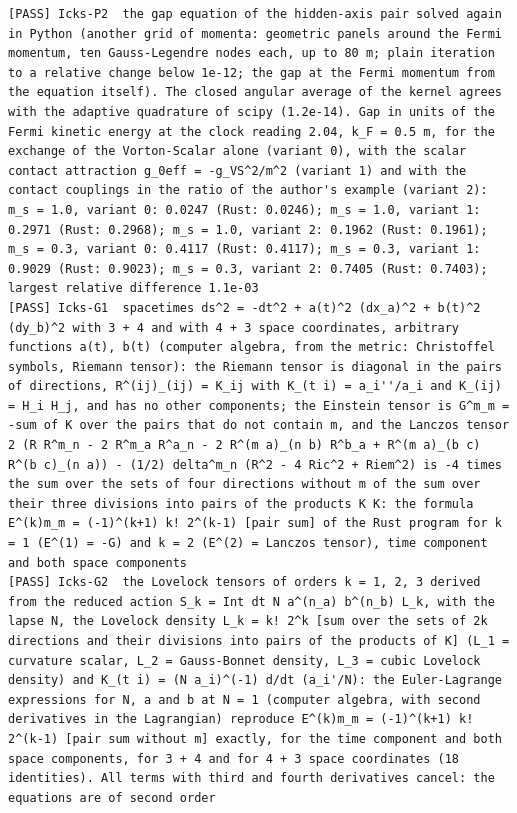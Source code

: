\documentclass[
  10pt,
]{article}
\begin{document}
\begin{verbatim}
[PASS] Icks-P2  the gap equation of the hidden-axis pair solved again in Python (another grid of momenta: geometric panels around the Fermi momentum, ten Gauss-Legendre nodes each, up to 80 m; plain iteration to a relative change below 1e-12; the gap at the Fermi momentum from the equation itself). The closed angular average of the kernel agrees with the adaptive quadrature of scipy (1.2e-14). Gap in units of the Fermi kinetic energy at the clock reading 2.04, k_F = 0.5 m, for the exchange of the Vorton-Scalar alone (variant 0), with the scalar contact attraction g_0eff = -g_VS^2/m^2 (variant 1) and with the contact couplings in the ratio of the author's example (variant 2): m_s = 1.0, variant 0: 0.0247 (Rust: 0.0246); m_s = 1.0, variant 1: 0.2971 (Rust: 0.2968); m_s = 1.0, variant 2: 0.1962 (Rust: 0.1961); m_s = 0.3, variant 0: 0.4117 (Rust: 0.4117); m_s = 0.3, variant 1: 0.9029 (Rust: 0.9023); m_s = 0.3, variant 2: 0.7405 (Rust: 0.7403); largest relative difference 1.1e-03
[PASS] Icks-G1  spacetimes ds^2 = -dt^2 + a(t)^2 (dx_a)^2 + b(t)^2 (dy_b)^2 with 3 + 4 and with 4 + 3 space coordinates, arbitrary functions a(t), b(t) (computer algebra, from the metric: Christoffel symbols, Riemann tensor): the Riemann tensor is diagonal in the pairs of directions, R^(ij)_(ij) = K_ij with K_(t i) = a_i''/a_i and K_(ij) = H_i H_j, and has no other components; the Einstein tensor is G^m_m = -sum of K over the pairs that do not contain m, and the Lanczos tensor 2 (R R^m_n - 2 R^m_a R^a_n - 2 R^(m a)_(n b) R^b_a + R^(m a)_(b c) R^(b c)_(n a)) - (1/2) delta^m_n (R^2 - 4 Ric^2 + Riem^2) is -4 times the sum over the sets of four directions without m of the sum over their three divisions into pairs of the products K K: the formula E^(k)m_m = (-1)^(k+1) k! 2^(k-1) [pair sum] of the Rust program for k = 1 (E^(1) = -G) and k = 2 (E^(2) = Lanczos tensor), time component and both space components
[PASS] Icks-G2  the Lovelock tensors of orders k = 1, 2, 3 derived from the reduced action S_k = Int dt N a^(n_a) b^(n_b) L_k, with the lapse N, the Lovelock density L_k = k! 2^k [sum over the sets of 2k directions and their divisions into pairs of the products of K] (L_1 = curvature scalar, L_2 = Gauss-Bonnet density, L_3 = cubic Lovelock density) and K_(t i) = (N a_i)^(-1) d/dt (a_i'/N): the Euler-Lagrange expressions for N, a and b at N = 1 (computer algebra, with second derivatives in the Lagrangian) reproduce E^(k)m_m = (-1)^(k+1) k! 2^(k-1) [pair sum without m] exactly, for the time component and both space components, for 3 + 4 and for 4 + 3 space coordinates (18 identities). All terms with third and fourth derivatives cancel: the equations are of second order

\end{verbatim}
\end{document}
